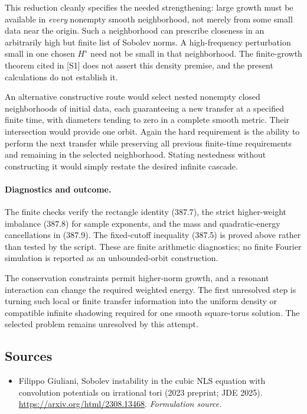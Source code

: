 \documentclass[11pt]{article}
\begin{document}
This reduction cleanly specifies the needed strengthening:
large growth must be available in \emph{every} nonempty smooth
neighborhood, not merely from some small data near the origin.
Such a neighborhood can prescribe closeness in an arbitrarily high
but finite list of Sobolev norms. A high-frequency perturbation small
in one chosen $H^s$ need not be small in that neighborhood. The
finite-growth theorem cited in [S1] does not assert this density
premise, and the present calculations do not establish it.

An alternative constructive route would select nested nonempty
closed neighborhoods of initial data, each guaranteeing a new
transfer at a specified finite time, with diameters tending to zero
in a complete smooth metric. Their intersection would provide one
orbit. Again the hard requirement is the ability to perform the next
transfer while preserving all previous finite-time requirements and
remaining in the selected neighborhood. Stating nestedness without
constructing it would simply restate the desired infinite cascade.

\paragraph{Diagnostics and outcome.}
The finite checks verify the rectangle identity (387.7), the
strict higher-weight imbalance (387.8) for sample exponents, and
the mass and quadratic-energy cancellations in (387.9). The
fixed-cutoff inequality (387.5) is proved above rather than tested
by the script. These are finite arithmetic diagnostics; no finite
Fourier simulation is reported as an
unbounded-orbit construction.

The conservation constraints permit higher-norm growth, and a
resonant interaction can change the required weighted energy.
The first unresolved step is turning such local or finite transfer
information into the uniform density or compatible infinite
shadowing required for one smooth square-torus solution. The
selected problem remains unresolved by this attempt.
\subsection{Sources}
\begin{itemize}
\item[S1]Filippo Giuliani, Sobolev instability in the cubic NLS equation with convolution potentials on irrational tori (2023 preprint; JDE 2025).
\url{https://arxiv.org/html/2308.13468}.
\textit{Formulation source.}
\end{itemize}
\end{document}
